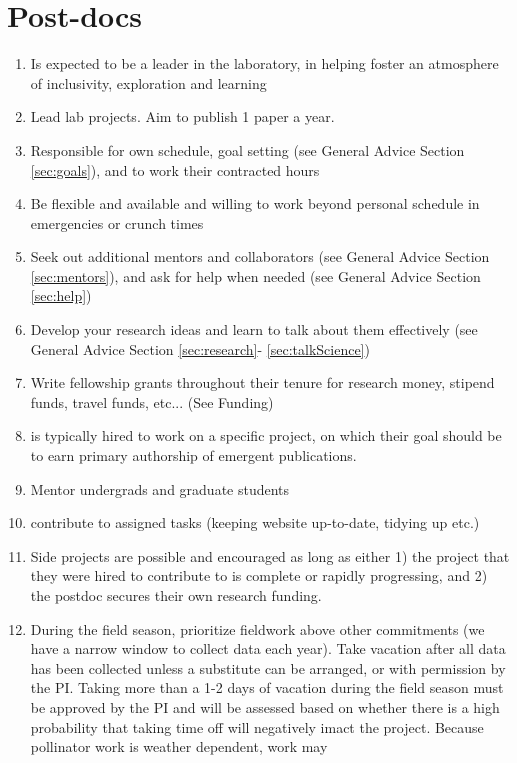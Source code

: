 \documentclass[12pt]{article}
\begin{document}
\section{Post-docs}
\begin{enumerate}
\item Is expected to be a leader in the laboratory, in helping foster
  an atmosphere of inclusivity, exploration and learning
 \item Lead lab projects. Aim to publish 1 paper a year.
\item  Responsible for own schedule, goal setting (see General
  Advice Section \ref{sec:goals}), and to work their contracted hours
\item Be flexible and available and willing to work beyond personal
  schedule in emergencies or crunch times
\item Seek out additional mentors and collaborators (see General
  Advice Section \ref{sec:mentors}), and ask for help when needed (see
  General Advice Section \ref{sec:help})
\item Develop your research ideas and learn to talk about them
  effectively (see General Advice Section \ref{sec:research}-
  \ref{sec:talkScience})
\item  Write fellowship grants throughout their tenure
  for research money, stipend funds, travel funds, etc... (See Funding)
\item is typically hired to work on a specific project, on which
  their goal should be to earn primary authorship of emergent
  publications.
\item Mentor undergrads and graduate students
\item contribute to assigned tasks (keeping website up-to-date,
  tidying up etc.)
\item Side projects are possible and encouraged as long as either 1)
  the project that they were hired to contribute to is complete or
  rapidly progressing, and 2) the postdoc secures their own research
  funding.
\item During the field season, prioritize fieldwork above other
  commitments (we have a narrow window to collect data each
  year). Take vacation after all data has been collected unless a
  substitute can be arranged, or with permission by the PI. Taking
  more than a 1-2 days of vacation during the field season must be
  approved by the PI and will be assessed based on whether there is a
  high probability that taking time off will negatively imact the
  project. Because pollinator work is weather dependent, work may

\end{enumerate}
\end{document}
